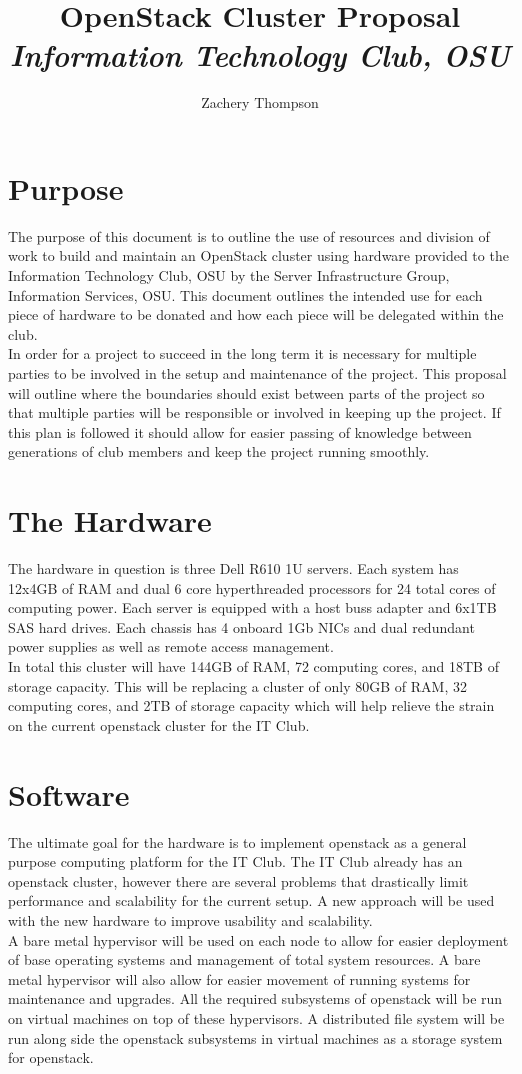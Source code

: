 \documentclass[12pt]{article}
\title{
\textbf{OpenStack Cluster Proposal}
\\
\textit{Information Technology Club, OSU}
}
\author{Zachery Thompson}
\begin{document}
\maketitle{}
\clearpage{}

\section{Purpose}
The purpose of this document is to outline the use of resources and division of work to build
and maintain an OpenStack cluster using hardware provided to the Information Technology Club, OSU
by the Server Infrastructure Group, Information Services, OSU. This document outlines the intended use
for each piece of hardware to be donated and how each piece will be delegated within the club. 
\\
In order for a project to succeed in the long term it is necessary for multiple parties to be involved
in the setup and maintenance of the project. This proposal will outline where the boundaries should 
exist between parts of the project so that multiple parties will be responsible or involved in keeping up
the project. If this plan is followed it should allow for easier passing of knowledge between generations 
of club members and keep the project running smoothly.

\section{The Hardware}
The hardware in question is three Dell R610 1U servers. Each system has 12x4GB of RAM and dual 6 core hyperthreaded
processors for 24 total cores of computing power. Each server is equipped with a host buss adapter and 6x1TB SAS hard
drives. Each chassis has 4 onboard 1Gb NICs and dual redundant power supplies as well as remote access management. 
\\
In total this cluster will have 144GB of RAM, 72 computing cores, and 18TB of storage capacity. This will be replacing
a cluster of only 80GB of RAM, 32 computing cores, and 2TB of storage capacity which will help relieve the strain on
the current openstack cluster for the IT Club.

\section{Software}
The ultimate goal for the hardware is to implement openstack as a general purpose computing platform for the IT Club. The
IT Club already has an openstack cluster, however there are several problems that drastically limit performance and scalability
for the current setup. A new approach will be used with the new hardware to improve usability and scalability.
\\
A bare metal hypervisor will be used on each node to allow for easier deployment of base operating systems and management of
total system resources. A bare metal hypervisor will also allow for easier movement of running systems for maintenance and upgrades.
All the required subsystems of openstack will be run on virtual machines on top of these hypervisors. A distributed file system will
be run along side the openstack subsystems in virtual machines as a storage system for openstack. 
\\
\end{document}
